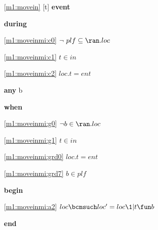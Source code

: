 \noindent \ref{m1:movein} [t] \textbf{event}
\begin{block}
  \item   \textbf{during}
  \begin{block}
  \item[ \eqref{m1:moveinmi:c0} ]$\neg ~ plf \subseteq \ran.loc $ %
  \item[ \eqref{m1:moveinmi:c1} ]$t \in in $ %
  \item[ \eqref{m1:moveinmi:c2} ]$loc.t = ent $ %
  \end{block}
  \item   \textbf{any} b
  \item   \textbf{when}
  \begin{block}
  \item[ \eqref{m1:moveinmi:g0} ]$\neg b \in \ran.loc  	$ %
  \item[ \eqref{m1:moveinmi:g1} ]$t \in in $ %
  \item[ \eqref{m1:moveinmi:grd0} ]$loc.t = ent $ %
  \item[ \eqref{m1:moveinmi:grd7} ]$b \in plf $ %
  \end{block}
  \item   \textbf{begin}
  \begin{block}
  \item[ \eqref{m1:moveinmi:a2} ]$loc \bcmsuch loc' = loc \1| t \fun b $ %
  \end{block}
  \item   \textbf{end} \\
\end{block}
